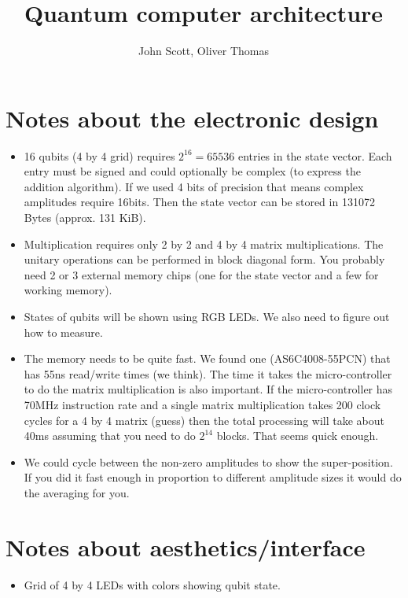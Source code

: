 \documentclass{article}
\begin{document}
\title{Quantum computer architecture}
 \author{John Scott, Oliver Thomas}
\maketitle


\section{Notes about the electronic design}

\begin{itemize}
    \item 16 qubits (4 by 4 grid) requires $2^{16}=65536$ entries in the state vector. Each entry must be signed and could optionally be complex (to express the addition algorithm). If we used 4 bits of precision that means complex amplitudes require 16bits. Then the state vector can be stored in 131072 Bytes (approx. 131 KiB).

\item Multiplication requires only 2 by 2 and 4 by 4 matrix multiplications. The unitary operations can be performed in block diagonal form. You probably need 2 or 3 external memory chips (one for the state vector and a few for working memory).

\item States of qubits will be shown using RGB LEDs. We also need to figure out how to measure.

\item The memory needs to be quite fast. We found one (AS6C4008-55PCN) that has 55ns
    read/write times (we think). The time it takes the micro-controller to do the matrix
    multiplication is also important. If the micro-controller has 70MHz instruction rate
    and a single matrix multiplication takes 200 clock cycles for a 4 by 4 matrix (guess)
    then the total processing will take about 40ms assuming that you need to do $2^{14}$ blocks. That seems quick enough.
  
\item We could cycle between the non-zero amplitudes to show the super-position. If you
    did it fast enough in proportion to different amplitude sizes it would do the
    averaging for you.
\end{itemize}

\section{Notes about aesthetics/interface}
\begin{itemize}
  \item Grid of 4 by 4 LEDs with colors showing qubit state.
\end{itemize}
\end{document}

